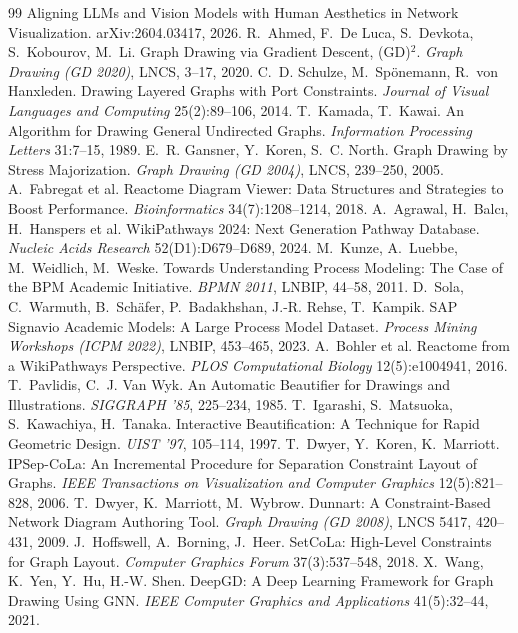 \documentclass[11pt]{article}
\begin{document}
\begin{thebibliography}{99}
 Aligning LLMs and Vision Models with Human Aesthetics in Network Visualization.
 arXiv:2604.03417, 2026.
 R.~Ahmed, F.~De Luca, S.~Devkota, S.~Kobourov, M.~Li. Graph Drawing via
 Gradient Descent, (GD)$^2$. \emph{Graph Drawing (GD 2020)}, LNCS, 3--17, 2020.
 C.~D. Schulze, M.~Sp\"onemann, R.~von Hanxleden. Drawing Layered Graphs
 with Port Constraints. \emph{Journal of Visual Languages and Computing} 25(2):89--106, 2014.
 T.~Kamada, T.~Kawai. An Algorithm for Drawing General Undirected Graphs.
 \emph{Information Processing Letters} 31:7--15, 1989.
 E.~R. Gansner, Y.~Koren, S.~C. North. Graph Drawing by Stress
 Majorization. \emph{Graph Drawing (GD 2004)}, LNCS, 239--250, 2005.
 A.~Fabregat et al. Reactome Diagram Viewer: Data Structures and
 Strategies to Boost Performance. \emph{Bioinformatics} 34(7):1208--1214, 2018.
 A.~Agrawal, H.~Balc\i, H.~Hanspers et al. WikiPathways 2024: Next
 Generation Pathway Database. \emph{Nucleic Acids Research} 52(D1):D679--D689, 2024.
 M.~Kunze, A.~Luebbe, M.~Weidlich, M.~Weske. Towards Understanding
 Process Modeling: The Case of the BPM Academic Initiative. \emph{BPMN 2011}, LNBIP,
 44--58, 2011.
 D.~Sola, C.~Warmuth, B.~Sch\"afer, P.~Badakhshan, J.-R. Rehse, T.~Kampik.
 SAP Signavio Academic Models: A Large Process Model Dataset. \emph{Process Mining
 Workshops (ICPM 2022)}, LNBIP, 453--465, 2023.
 A.~Bohler et al. Reactome from a WikiPathways Perspective. \emph{PLOS
 Computational Biology} 12(5):e1004941, 2016.
 T.~Pavlidis, C.~J. Van Wyk. An Automatic Beautifier for Drawings and
 Illustrations. \emph{SIGGRAPH '85}, 225--234, 1985.
 T.~Igarashi, S.~Matsuoka, S.~Kawachiya, H.~Tanaka. Interactive
 Beautification: A Technique for Rapid Geometric Design. \emph{UIST '97}, 105--114, 1997.
 T.~Dwyer, Y.~Koren, K.~Marriott. IPSep-CoLa: An Incremental
 Procedure for Separation Constraint Layout of Graphs. \emph{IEEE Transactions on
 Visualization and Computer Graphics} 12(5):821--828, 2006.
 T.~Dwyer, K.~Marriott, M.~Wybrow. Dunnart: A Constraint-Based Network
 Diagram Authoring Tool. \emph{Graph Drawing (GD 2008)}, LNCS 5417, 420--431, 2009.
 J.~Hoffswell, A.~Borning, J.~Heer. SetCoLa: High-Level Constraints
 for Graph Layout. \emph{Computer Graphics Forum} 37(3):537--548, 2018.
 X.~Wang, K.~Yen, Y.~Hu, H.-W. Shen. DeepGD: A Deep Learning Framework
 for Graph Drawing Using GNN. \emph{IEEE Computer Graphics and Applications}
 41(5):32--44, 2021.
\end{thebibliography}
\end{document}

